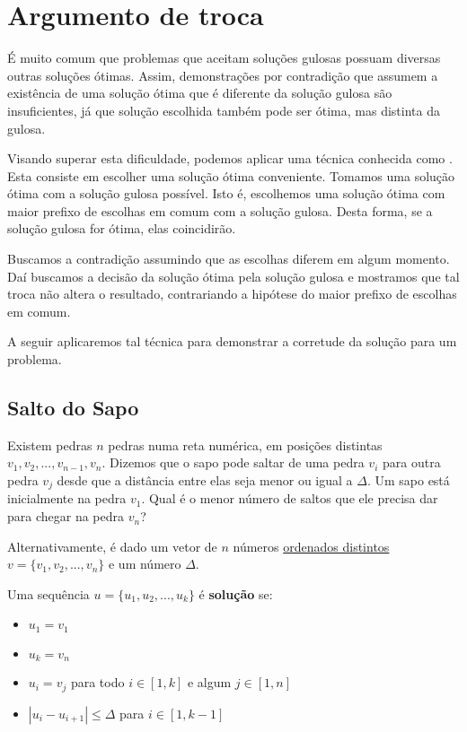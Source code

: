 \chapter{Argumento de troca}
\label{salto}

É muito comum que problemas que aceitam soluções gulosas possuam diversas outras soluções ótimas. Assim, demonstrações por contradição que assumem a existência de uma solução ótima que é diferente da solução gulosa são insuficientes, já que solução escolhida também pode ser ótima, mas distinta da gulosa.

Visando superar esta dificuldade, podemos aplicar uma técnica conhecida como . Esta consiste em escolher uma solução ótima conveniente. Tomamos uma solução ótima  com a solução gulosa possível. Isto é, escolhemos uma solução ótima com maior prefixo de escolhas em comum com a solução gulosa. Desta forma, se a solução gulosa for ótima, elas coincidirão.

Buscamos a contradição assumindo que as escolhas diferem em algum momento. Daí buscamos  a decisão da solução ótima pela solução gulosa e mostramos que tal troca não altera o resultado, contrariando a hipótese do maior prefixo de escolhas em comum.

A seguir aplicaremos tal técnica para demonstrar a corretude da solução para um problema.

\section{Salto do Sapo}

Existem pedras $n$ pedras numa reta numérica, em posições distintas $v_1, v_2, ..., v_{n - 1}, v_n$. Dizemos que o sapo pode saltar de uma pedra $v_i$ para outra pedra $v_j$ desde que a distância entre elas seja menor ou igual a $\Delta$. Um sapo está inicialmente na pedra $v_1$. Qual é o menor número de saltos que ele precisa dar para chegar na pedra $v_n$? 

Alternativamente, é dado um vetor de $n$ números \underline{ordenados distintos} $v = \{v_1, v_2, ..., v_n\}$ e um número $\Delta$.

Uma sequência $u = \{u_1, u_2, ..., u_k\}$ é \textbf{solução} se:
\begin{itemize}
    \item $u_1 = v_1$
    \item $u_k = v_n$
    \item $u_i = v_j$ para todo $i \in [1, k]$ e algum $j \in [1, n]$
    \item $|u_i - u_{i + 1}| \leq \Delta$ para $i \in [1, k - 1]$
\end{itemize}

